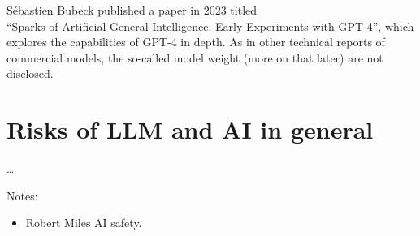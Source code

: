 \documentclass[
]{book}
\providecommand{\tightlist}{%
  \setlength{\itemsep}{0pt}\setlength{\parskip}{0pt}}
\begin{document}
Sébastien Bubeck published a paper in 2023 titled\\
\href{https://arxiv.org/pdf/2303.12712}{``Sparks of Artificial General Intelligence:
Early Experiments with GPT-4''},
which explores the capabilities of GPT-4 in depth.
As in other technical reports of commercial models,
the so-called model weight (more on that later) are not disclosed.

\section{Risks of LLM and AI in general}\label{risks-of-llm-and-ai-in-general}

\ldots{}

Notes:

\begin{itemize}
\tightlist
\item
  Robert Miles AI safety.
\end{itemize}


\end{document}
